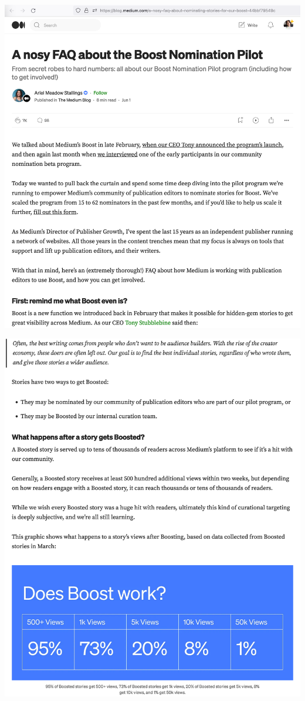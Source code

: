 
\begin{center}
    \includegraphics[width=38em]{stallings-faq-p1}
\end{center}
\WillContinue
\pagebreak

\Continuing
\begin{center}
    \includegraphics[width=38em]{stallings-faq-p2}
\end{center}
\WillContinue
\pagebreak

